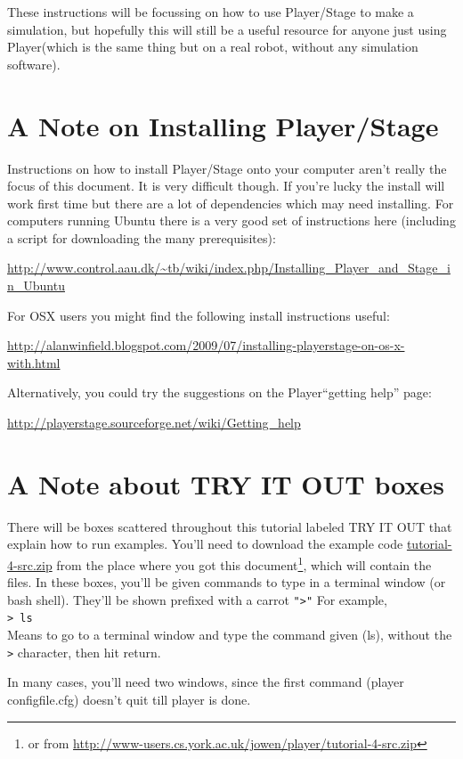 \documentclass[a4paper]{report}
\newcommand{\plst}{Player/Stage\xspace}
\newcommand{\pl}{Player\xspace}
\begin{document}
These instructions will be focussing on how to use \plst to make a simulation, but hopefully this will still be a useful resource for anyone just using \pl (which is the same thing but on a real robot, without any simulation software).

\section{A Note on Installing \plst}
Instructions on how to install \plst onto your computer aren't really the focus of this document. It is very difficult though. If you're lucky the install will work first time but there are a lot of dependencies which may need installing. For computers running Ubuntu there is a very good set of instructions here (including a script for downloading the many prerequisites):
\begin{center}
\url{http://www.control.aau.dk/~tb/wiki/index.php/Installing_Player_and_Stage_in_Ubuntu}
\end{center}
For OSX users you might find the following install instructions useful:
\begin{center}
\url{http://alanwinfield.blogspot.com/2009/07/installing-playerstage-on-os-x-with.html}
\end{center}
Alternatively, you could try the suggestions on the \pl ``getting help'' page:
\begin{center}
	\url{http://playerstage.sourceforge.net/wiki/Getting_help}
\end{center}

\section{A Note about TRY IT OUT boxes}
There will be boxes scattered throughout this tutorial labeled TRY IT OUT
that explain how to run examples. You'll need to download the example code
\url{tutorial-4-src.zip} from the place where you got this
document\footnote{or from
\url{http://www-users.cs.york.ac.uk/jowen/player/tutorial-4-src.zip}},
which will contain the files. In these boxes, you'll be given commands to
type in a terminal
window (or bash shell). They'll be shown prefixed with a carrot {\tt ">"} For
example, \\
{\tt > ls } \\
Means to go to a terminal window and type the command given (ls), without
the {\tt >} character, then hit return.

In many cases, you'll need two windows, since the first command (player
configfile.cfg) doesn't quit till player is done.  
\end{document}
